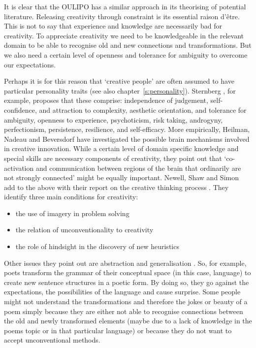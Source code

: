 It is clear that the \ac{OULIPO} has a similar approach in its theorising of potential literature. Releasing creativity through constraint is its essential raison d'être. This is not to say that experience and knowledge are necessarily bad for creativity. To appreciate creativity we need to be knowledgeable in the relevant domain to be able to recognise old and new connections and transformations. But we also need a certain level of openness and tolerance for ambiguity to overcome our expectations.

Perhaps it is for this reason that `creative people' are often assumed to have particular personality traits (see also chapter~\ref{s:personality}). Sternberg \autocite*{Sternberg1999}, for example, proposes that these comprise: independence of judgement, self-confidence, and attraction to complexity, aesthetic orientation, and tolerance for ambiguity, openness to experience, psychoticism, risk taking, androgyny, perfectionism, persistence, resilience, and self-efficacy. More empirically, Heilman, Nadeau and Beversdorf \autocite*{Heilman2003} have investigated the possible brain mechanisms involved in creative innovation. While a certain level of domain specific knowledge and special skills are necessary components of creativity, they point out that `co-activation and communication between regions of the brain that ordinarily are not strongly connected' might be equally important. Newell, Shaw and Simon add to the above with their report on the creative thinking process \autocite*{Newell1963}. They identify three main conditions for creativity:

\begin{itemize}
  \item the use of imagery in problem solving
  \item the relation of unconventionality to creativity
  \item the role of hindsight in the discovery of new heuristics
\end{itemize}

Other issues they point out are abstraction and generalisation \autocite*{Newell1963}. So, for example, poets transform the grammar of their conceptual space (in this case, language) to create new sentence structures in a poetic form. By doing so, they go against the expectations, the possibilities of the language and cause surprise. Some people might not understand the transformations and therefore the jokes or beauty of a poem simply because they are either not able to recognise connections between the old and newly transformed elements (maybe due to a lack of knowledge in the poems topic or in that particular language) or because they do not want to accept unconventional methods.

